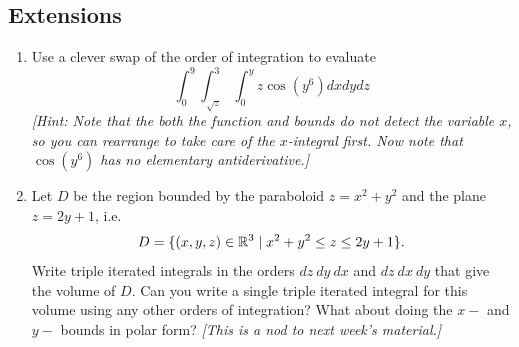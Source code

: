 \subsection*{Extensions}
\begin{enumerate}[resume]
	
		
	\item Use a clever swap of the order of integration to evaluate 
    \begin{equation*}
    \int_0^9\int_{\sqrt{z}}^3\int_0^yz\cos(y^6)dxdydz
    \end{equation*}
    \textit{[Hint: Note that the both the function and bounds do not detect the variable $x$, so you can rearrange to take care of the $x$-integral first. Now note that $\cos(y^6)$ has no elementary antiderivative.]}
    
	
	\item Let $D$ be the region bounded by the paraboloid $z=x^2+y^2$ and the 
	plane $z=2y+1$, i.e. \[D=\{(x,y,z) \in \mathbb{R}^3 \mid x^2+y^2 \leq z \leq 2y+1\}.\] 
	Write triple iterated integrals in the orders $dz\ dy\ dx$ and  $dz\ dx\ dy$
	that give the volume of $D$.  Can you write a single triple iterated integral for this volume using any other orders of integration? What about doing the $x-$ and $y-$ bounds in polar form? \textit{[This is a nod to next week's material.]}

\end{enumerate}

